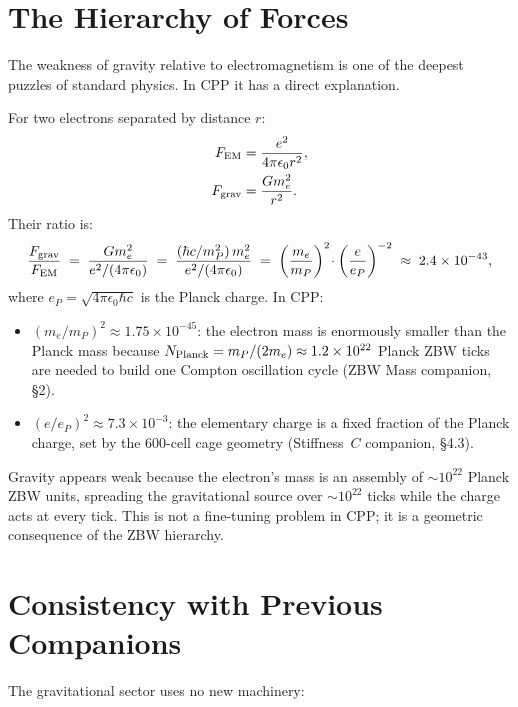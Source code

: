 \documentclass[12pt]{article}
\newcommand{\mP}{m_P}
\newcommand{\eP}{e_P}
\begin{document}
\section{The Hierarchy of Forces}
\label{sec:hierarchy}

The weakness of gravity relative to electromagnetism is one of the deepest
puzzles of standard physics.  In CPP it has a direct explanation.

For two electrons separated by distance $r$:
\begin{align}
  F_{\rm EM}   &= \frac{e^2}{4\pi\epsilon_0 r^2}, \\
  F_{\rm grav} &= \frac{G m_e^2}{r^2}.
\end{align}
Their ratio is:
\begin{equation}
  \frac{F_{\rm grav}}{F_{\rm EM}}
  \;=\; \frac{G m_e^2}{e^2/(4\pi\epsilon_0)}
  \;=\; \frac{(\hbar c/\mP^2)\,m_e^2}{e^2/(4\pi\epsilon_0)}
  \;=\; \left(\frac{m_e}{\mP}\right)^2 \!\cdot \left(\frac{e}{\eP}\right)^{-2}
  \;\approx\; 2.4\times10^{-43},
  \label{eq:hierarchy}
\end{equation}
where $\eP = \sqrt{4\pi\epsilon_0\hbar c}$ is the Planck charge.  In CPP:
\begin{itemize}[noitemsep]
  \item $(m_e/\mP)^2 \approx 1.75\times10^{-45}$: the electron mass is
    enormously smaller than the Planck mass because $N_{\rm Planck} =
    \mP/(2m_e) \approx 1.2\times10^{22}$ Planck ZBW ticks are needed
    to build one Compton oscillation cycle (ZBW Mass companion, \S2).
  \item $(e/\eP)^2 \approx 7.3\times10^{-3}$: the elementary charge is
    a fixed fraction of the Planck charge, set by the 600-cell cage
    geometry (Stiffness~$C$ companion, \S4.3).
\end{itemize}
Gravity appears weak because the electron's mass is an assembly of
$\sim10^{22}$ Planck ZBW units, spreading the gravitational source over
$\sim10^{22}$ ticks while the charge acts at every tick.  This is not a
fine-tuning problem in CPP; it is a geometric consequence of the ZBW
hierarchy.

\section{Consistency with Previous Companions}
\label{sec:consistency}

The gravitational sector uses no new machinery:
\end{document}
